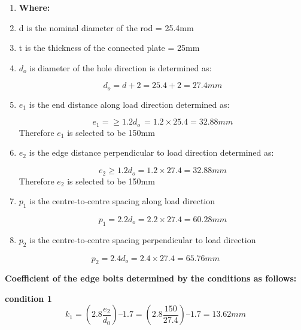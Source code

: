 {\begin{enumerate}[label={}]
\item \textbf{Where:}
\item d is the nominal diameter of the rod = 25.4mm 
\item t is the thickness of the connected plate = 25mm


\item \(d_o\) is diameter of the hole direction is determined as:

\begin{equation}
d_o=d+2 = 25.4 + 2 = 27.4mm 
\end{equation} 

\item \(e_1\) is the end distance along load direction determined as:

\begin{equation}
 e_1= \geq 1.2d_{o\ }= 1.2 \times 25.4 = 32.88mm 
\end{equation}
Therefore \(e_1\) is selected to be 150mm

\item \(e_2\) is the edge distance perpendicular to load direction determined as:

\begin{equation}
 e_2 \geq 1.2d_o = 1.2\times27.4 = 32.88mm
\end{equation}
Therefore \(e_2\) is selected to be 150mm

\item \(p_1\) is the centre-to-centre spacing along load direction 

\begin{equation}
 p_1 = 2.2d_o = 2.2\times 27.4 = 60.28mm
\end{equation}

\item \(p_2\) is the centre-to-centre spacing perpendicular to load direction 
\end{enumerate}

\begin{equation}
p_2=2.4d_o = 2.4\times27.4=65.76mm
\end{equation}

\textbf{Coefficient of the  edge bolts determined by the conditions as follows:}

\textbf{condition 1}
\begin{equation}
 k_1 = (2.8\frac{e_2}{d_0}) – 1.7 = (2.8 \frac{150}{27.4}) – 1.7 = 13.62mm
\end{equation}

}
